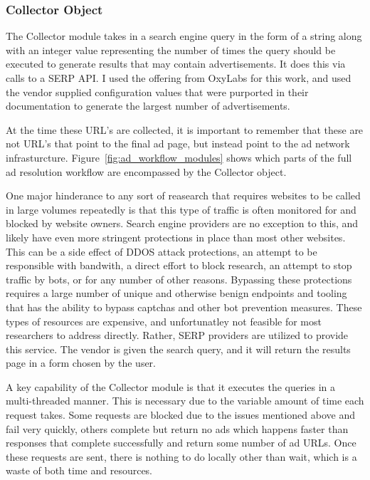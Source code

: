 \documentclass[sigconf]{acmart}
\begin{document}
\subsubsection{Collector Object}
The Collector module takes in a search engine query in the form of a string
along with an integer value representing the number of times the query should
be executed to generate results that may contain advertisements.
It does this via calls to a SERP API.
I used the offering from OxyLabs for this work, and used the vendor supplied
configuration values that were purported in their documentation to generate the
largest number of advertisements.

At the time these URL's are collected, it is important to remember that these
are not URL's that point to the final ad page, but instead point to the ad
network infrasturcture. Figure~\ref{fig:ad_workflow_modules} shows which parts
of the full ad resolution workflow are encompassed by the Collector object.

One major hinderance to any sort of reasearch that requires websites to be
called in large volumes repeatedly is that this type of traffic is often
monitored for and blocked by website owners.
Search engine providers are no exception to this, and likely have even more
stringent protections in place than most other websites.
This can be a side effect of DDOS attack protections, an attempt to be
responsible with bandwith, a direct effort to block research, an attempt to
stop traffic by bots, or for any number of other reasons.
Bypassing these protections requires a large number of unique and otherwise
benign endpoints 
and tooling that has the ability to bypass captchas and other bot prevention
measures.
These types of resources are expensive, and unfortunatley not feasible for most
researchers to address directly.
Rather, SERP providers are utilized to provide this service.
The vendor is given the search query, and it will return the results page in a
form chosen by the user.

A key capability of the Collector module is that it executes the queries in a
multi-threaded manner.
This is necessary due to the variable amount of time each request takes.
Some requests are blocked due to the issues mentioned above and fail very
quickly, others complete but return no ads which happens faster than responses
that complete successfully and return some number of ad URLs.
Once these requests are sent, there is nothing to do locally other than wait,
which is a waste of both time and resources. 
\end{document}
